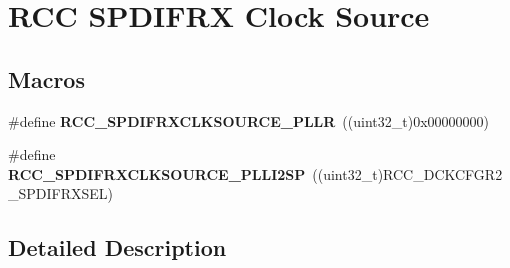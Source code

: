 \hypertarget{group___r_c_c_ex___s_p_d_i_f_r_x___clock___source}{}\section{R\+CC S\+P\+D\+I\+F\+RX Clock Source}
\label{group___r_c_c_ex___s_p_d_i_f_r_x___clock___source}
\subsection*{Macros}
\begin{DoxyCompactItemize}
\item 
\#define {\bfseries R\+C\+C\+\_\+\+S\+P\+D\+I\+F\+R\+X\+C\+L\+K\+S\+O\+U\+R\+C\+E\+\_\+\+P\+L\+LR}~((uint32\+\_\+t)0x00000000)\hypertarget{group___r_c_c_ex___s_p_d_i_f_r_x___clock___source_ga425faf35511c589534774433c2b6f3bf}{}\label{group___r_c_c_ex___s_p_d_i_f_r_x___clock___source_ga425faf35511c589534774433c2b6f3bf}

\item 
\#define {\bfseries R\+C\+C\+\_\+\+S\+P\+D\+I\+F\+R\+X\+C\+L\+K\+S\+O\+U\+R\+C\+E\+\_\+\+P\+L\+L\+I2\+SP}~((uint32\+\_\+t)R\+C\+C\+\_\+\+D\+C\+K\+C\+F\+G\+R2\+\_\+\+S\+P\+D\+I\+F\+R\+X\+S\+EL)\hypertarget{group___r_c_c_ex___s_p_d_i_f_r_x___clock___source_ga471e14bed2da8716c0da908d0f99fbc3}{}\label{group___r_c_c_ex___s_p_d_i_f_r_x___clock___source_ga471e14bed2da8716c0da908d0f99fbc3}

\end{DoxyCompactItemize}


\subsection{Detailed Description}
